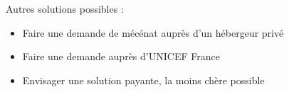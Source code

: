 \begin{frame}
    Autres solutions possibles :
      \begin{itemize}
        \item Faire une demande de mécénat auprès d'un hébergeur privé
        \item Faire une demande auprès d'UNICEF France
        \item Envisager une solution payante, la moins chère possible
      \end{itemize}
\end{frame}

